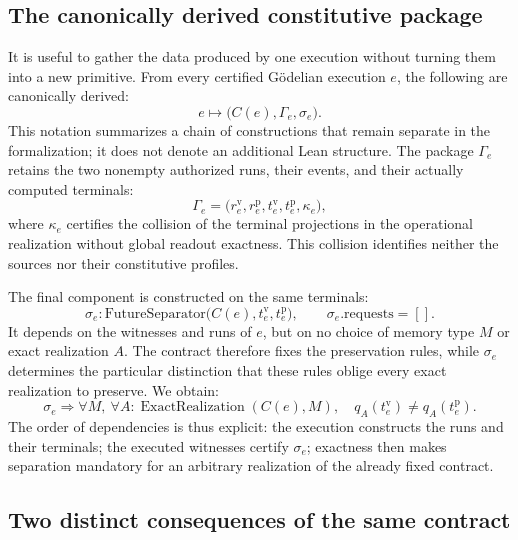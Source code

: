 \documentclass[11pt,a4paper]{article}
\newcommand{\ExactRealization}{\operatorname{ExactRealization}}
\theoremstyle{remark}
\begin{document}
\subsection{The canonically derived constitutive package}

It is useful to gather the data produced by one execution without turning
them into a new primitive. From every certified Gödelian execution $e$, the
following are canonically derived:
\begin{equation}\label{eq:constitutive-package}
e\longmapsto\bigl(C(e),\Gamma_e,\sigma_e\bigr).
\end{equation}
This notation summarizes a chain of constructions that remain separate in
the formalization; it does not denote an additional Lean structure. The
package $\Gamma_e$ retains the two nonempty authorized runs, their events,
and their actually computed terminals:
\[
\Gamma_e=
\bigl(r_e^{\mathrm v},r_e^{\mathrm p},
      t_e^{\mathrm v},t_e^{\mathrm p},\kappa_e\bigr),
\]
where $\kappa_e$ certifies the collision of the terminal projections in the
operational realization without global readout exactness. This collision
identifies neither the sources nor their constitutive profiles.

The final component is constructed on the same terminals:
\begin{equation}\label{eq:sigma-package}
\sigma_e:
\mathrm{FutureSeparator}
  \bigl(C(e),t_e^{\mathrm v},t_e^{\mathrm p}\bigr),
\qquad \sigma_e.\mathrm{requests}=[].
\end{equation}
It depends on the witnesses and runs of $e$, but on no choice of memory
type $M$ or exact realization $A$. The contract therefore fixes the
preservation rules, while $\sigma_e$ determines the particular distinction
that these rules oblige every exact realization to preserve. We obtain:
\begin{equation}\label{eq:package-obligation}
\boxed{
\sigma_e\Longrightarrow
\forall M,\ \forall A:\ExactRealization(C(e),M),\quad
q_A(t_e^{\mathrm v})\neq q_A(t_e^{\mathrm p}).}
\end{equation}
The order of dependencies is thus explicit: the execution constructs the
runs and their terminals; the executed witnesses certify $\sigma_e$;
exactness then makes separation mandatory for an arbitrary realization of
the already fixed contract.

\subsection{Two distinct consequences of the same contract}
\end{document}
